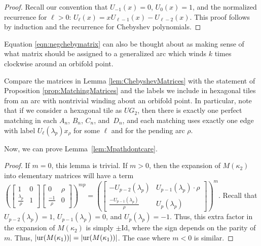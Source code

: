 \begin{proof}Recall our convention that $U_{-1}(x) = 0$, $U_0(x) = 1$, and the normalized recurrence for $\ell > 0$: $U_\ell(x) = x U_{\ell-1}(x) - U_{\ell-2}(x)$. This proof follows by induction and the recurrence for Chebyshev polynomials.
\end{proof}

\begin{Remark}Equation \ref{eqn:negchebymatrix} can also be thought about as making sense of what matrix should be assigned to a generalized arc which winds $k$ times clockwise around an orbifold point.
\end{Remark}

\begin{Remark}Compare the matrices in Lemma \ref{lem:ChebyshevMatrices} with the statement of Proposition \ref{prop:MatchingMatrices} and the labels we include in hexagonal tiles from an arc with nontrivial winding about an orbifold point. In particular, note that if we consider a hexagonal tile as $UG_2$, then there is exactly one perfect matching in each $A_n$, $B_n$, $C_n$, and~$D_n$, and each matching uses exactly one edge with label $U_\ell(\lambda_p)x_\rho$ for some $\ell$ and for the pending arc $\rho$.
\end{Remark}

Now, we can prove Lemma~\ref{lem:Mpathdontcare}.

\begin{proof}If $m = 0$, this lemma is trivial. If $m > 0$, then the expansion of $M(\kappa_2)$ into elementary matrices will have a term $\left( \left[\begin{smallmatrix} 1 & 0 \\ \frac{\lambda_p}{\rho} & 1 \end{smallmatrix}\right] \left[\begin{smallmatrix} 0 & \rho \\ \frac{-1}{\rho} & 0 \end{smallmatrix}\right] \right)^{mp} = \left(\left[\begin{smallmatrix} -U_{p-2} (\lambda_p) & U_{p-1}(\lambda_p) \cdot \rho \\ \frac{-U_{p-1}(\lambda_p)}{\rho} & U_p(\lambda_p) \end{smallmatrix}\right]\right)^m $. Recall that $U_{p-2}(\lambda_p) = 1$, $U_{p-1}(\lambda_p) = 0$, and $U_p(\lambda_p) = -1$. Thus, this extra factor in the expansion of $M(\kappa_2)$ is simply $\pm \text{Id}$, where the sign depends on the parity of $m$. Thus, $\vert {\rm ur}(M(\kappa_1)) \vert = \vert {\rm ur}(M(\kappa_1)) \vert$. The case where $m < 0$ is similar.
\end{proof}

